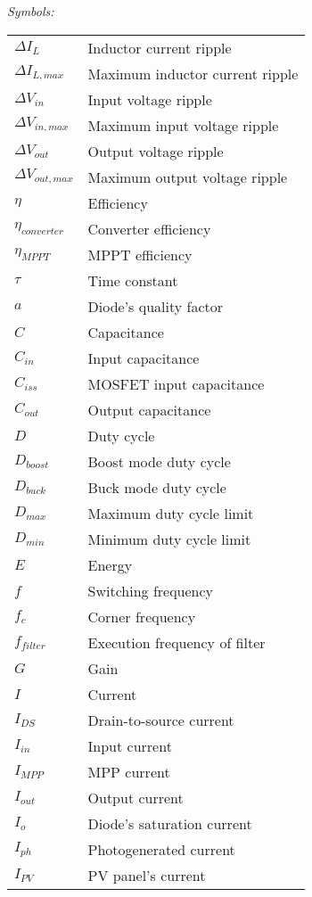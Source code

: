 \vspace{5mm} %
\newpage
\noindent\textit{Symbols:}\newline
\begin{tabular}{ll}
$\Delta I_{L}$ & Inductor current ripple\\
$\Delta I_{L,max}$ & Maximum inductor current ripple\\
$\Delta V_{in}$ & Input voltage ripple\\
$\Delta V_{in,max}$ & Maximum input voltage ripple\\
$\Delta V_{out}$ & Output voltage ripple\\
$\Delta V_{out,max}$ & Maximum output voltage ripple\\
$\eta$ & Efficiency\\
$\eta_{converter}$ & Converter efficiency\\
$\eta_{MPPT}$ & MPPT efficiency\\
$\tau$ & Time constant\\
$a$ & Diode's quality factor \\
$C$ & Capacitance\\
$C_{in}$ & Input capacitance\\
$C_{iss}$ & MOSFET input capacitance \\ 
$C_{out}$ & Output capacitance\\
$D$ & Duty cycle\\
$D_{boost}$ & Boost mode duty cycle\\
$D_{buck}$ & Buck mode duty cycle\\
$D_{max}$  & Maximum duty cycle limit \\
$D_{min}$  & Minimum duty cycle limit \\ 
$E$ & Energy\\
$f$ & Switching frequency\\
$f_{c}$ & Corner frequency \\
$f_{filter}$ & Execution frequency of filter\\
$G$ & Gain \\
$I$ & Current\\
$I_{DS}$ & Drain-to-source current \\
$I_{in}$ & Input current \\
$I_{MPP}$ & MPP current\\
$I_{out}$ & Output current \\
$I_{o}$ & Diode's saturation current \\
$I_{ph}$ & Photogenerated current \\
$I_{PV}$ & PV panel's current \\

\end{tabular}
